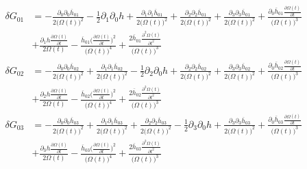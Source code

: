 \documentclass[10pt,letterpaper]{article}
\begin{document}
\begin{align}
	\delta G_{01} &=- \frac{\partial_{0}\partial_{0}\overline{h}_{01}}{2 \bigl(\Omega(t)\bigr)^2} -  \tfrac{1}{2} \partial_{1}\partial_{0}h + \frac{\partial_{1}\partial_{1}\overline{h}_{01}}{2 \bigl(\Omega(t)\bigr)^2} + \frac{\partial_{2}\partial_{2}\overline{h}_{01}}{2 \bigl(\Omega(t)\bigr)^2} + \frac{\partial_{3}\partial_{3}\overline{h}_{01}}{2 \bigl(\Omega(t)\bigr)^2} + \frac{\partial_{0}\overline{h}_{01} \frac{\partial \Omega(t)}{\partial t}}{\bigl(\Omega(t)\bigr)^3}\\
& + \frac{\partial_{1}h \frac{\partial \Omega(t)}{\partial t}}{2 \Omega(t)} -  \frac{\overline{h}_{01} \bigl(\frac{\partial \Omega(t)}{\partial t}\bigr)^2}{\bigl(\Omega(t)\bigr)^4} + \frac{2 \overline{h}_{01} \frac{\partial^{2}\Omega(t)}{\partial t^{2}}}{\bigl(\Omega(t)\bigr)^3}
\end{align}
\begin{align}
	\delta G_{02} &= - \frac{\partial_{0}\partial_{0}\overline{h}_{02}}{2 \bigl(\Omega(t)\bigr)^2} + \frac{\partial_{1}\partial_{1}\overline{h}_{02}}{2 \bigl(\Omega(t)\bigr)^2} -  \tfrac{1}{2} \partial_{2}\partial_{0}h + \frac{\partial_{2}\partial_{2}\overline{h}_{02}}{2 \bigl(\Omega(t)\bigr)^2} + \frac{\partial_{3}\partial_{3}\overline{h}_{02}}{2 \bigl(\Omega(t)\bigr)^2} + \frac{\partial_{0}\overline{h}_{02} \frac{\partial \Omega(t)}{\partial t}}{\bigl(\Omega(t)\bigr)^3} \\
&+ \frac{\partial_{2}h \frac{\partial \Omega(t)}{\partial t}}{2 \Omega(t)} -  \frac{\overline{h}_{02} \bigl(\frac{\partial \Omega(t)}{\partial t}\bigr)^2}{\bigl(\Omega(t)\bigr)^4} + \frac{2 \overline{h}_{02} \frac{\partial^{2}\Omega(t)}{\partial t^{2}}}{\bigl(\Omega(t)\bigr)^3}
\end{align}
\begin{align}
	\delta G_{03} &= - \frac{\partial_{0}\partial_{0}\overline{h}_{03}}{2 \bigl(\Omega(t)\bigr)^2} + \frac{\partial_{1}\partial_{1}\overline{h}_{03}}{2 \bigl(\Omega(t)\bigr)^2} + \frac{\partial_{2}\partial_{2}\overline{h}_{03}}{2 \bigl(\Omega(t)\bigr)^2} -  \tfrac{1}{2} \partial_{3}\partial_{0}h + \frac{\partial_{3}\partial_{3}\overline{h}_{03}}{2 \bigl(\Omega(t)\bigr)^2} + \frac{\partial_{0}\overline{h}_{03} \frac{\partial \Omega(t)}{\partial t}}{\bigl(\Omega(t)\bigr)^3} \\
&+ \frac{\partial_{3}h \frac{\partial \Omega(t)}{\partial t}}{2 \Omega(t)} -  \frac{\overline{h}_{03} \bigl(\frac{\partial \Omega(t)}{\partial t}\bigr)^2}{\bigl(\Omega(t)\bigr)^4} + \frac{2 \overline{h}_{03} \frac{\partial^{2}\Omega(t)}{\partial t^{2}}}{\bigl(\Omega(t)\bigr)^3}
\end{align}
\end{document}
